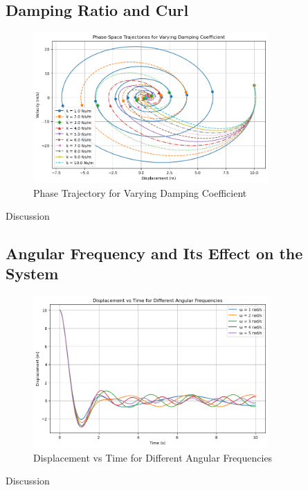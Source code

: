 \documentclass[12pt,a4paper]{article}
\begin{document}
\subsection{Damping Ratio and Curl}
\begin{figure}[H]
    \centering
    \includegraphics[width=0.8\textwidth]{damping_ratio_to_curl.png} 
    \caption{Phase Trajectory for Varying Damping Coefficient}
    \label{fig:system}
\end{figure}
{\vspace{10pt}}
Discussion
{\vspace{10pt}}

\subsection{Angular Frequency and Its Effect on the System}
\begin{figure}[H]
    \centering
    \includegraphics[width=0.8\textwidth]{angular_freq_effect_on_system.png} 
    \caption{Displacement vs Time for Different Angular Frequencies}
    \label{fig:system}
\end{figure}
{\vspace{10pt}}
Discussion
{\vspace{10pt}}
\end{document}
